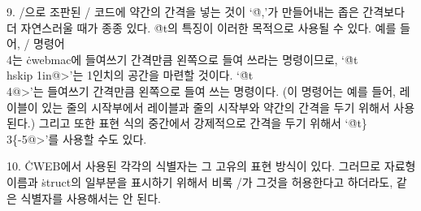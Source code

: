 9. \TEX/으로 조판된 \CEE/ 코드에 약간의 간격을 넣는 것이 `\.{@,}'가 만들어내는 좁은
간격보다 더 자연스러울 때가 종종 있다.  \.{@t}의 특징이 이러한 목적으로 사용될 수 있다.
예를 들어, \TEX/ 명령어 \.{\\4}는 \.{cwebmac}에 들여쓰기 간격만큼 왼쪽으로 들여 쓰라는
명령이므로, `\.{@t\\hskip 1in@>}'는 1인치의 공간을 마련할 것이다. `\.{@t\\4@>}'는
들여쓰기 간격만큼 왼쪽으로 들여 쓰는 명령이다. (이 명령어는 예를 들어, 레이블이 있는 줄의
시작부에서 레이블과 줄의 시작부와 약간의 간격을 두기 위해서 사용된다.) 그리고 또한 표현 식의
중간에서 강제적으로 간격을 두기 위해서 `\.{@t\}\\3\{-5@>}'를 사용할 수도 있다.

10. \.{CWEB}에서 사용된 각각의 식별자는 그 고유의 표현 방식이 있다. 그러므로 자료형 이름과
\.{struct}의 일부분을 표시하기 위해서 비록 \CEE/가 그것을 허용한다고 하더라도, 같은 식별자를
사용해서는 안 된다. 

